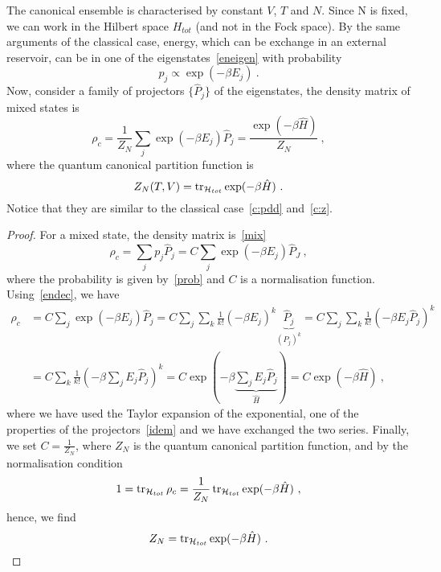     The canonical ensemble is characterised by constant $V$, $T$ and $N$. Since N
    is fixed, we can work in the Hilbert space $H_{tot}$ (and not in the Fock space).
    By the same arguments of the classical case, energy, which can be exchange in an external reservoir, can be in one of the eigenstates~\eqref{eneigen} with probability 
    \begin{equation}\label{prob}
        p_j \propto \exp(- \beta E_j) ~.
    \end{equation}
    Now, consider a family of projectors $\{\hat P_j\}$ of the eigenstates, the density matrix of mixed states is 
    \begin{equation*}
        \rho_c = \frac{1}{Z_N } \sum_j \exp(- \beta E_j) \hat P_j = \frac{\exp(- \beta \hat H)}{Z_N} ~,
    \end{equation*}
    where the quantum canonical partition function is 
    \begin{equation}\label{qgc:cz}
        Z_N(T,V) = \operatorname{tr}_{\mathcal H_{tot}} \exp(- \beta \hat H) ~.
    \end{equation}
    Notice that they are similar to the classical case~\eqref{c:pdd} and~\eqref{c:z}.
    \begin{proof}
        For a mixed state, the density matrix is~\eqref{mix}
        \begin{equation*}
            \rho_c = \sum_j p_j \hat P_j = C \sum_j \exp(- \beta E_j) \hat P_J ~,
        \end{equation*}
        where the probability is given by~\eqref{prob} and $C$ is a normalisation function.
        Using~\eqref{endec}, we have
        \begin{equation*}
        \begin{aligned}
            \rho_c & = C \sum_j \exp(- \beta E_j) \hat P_j = C \sum_j \sum_k \frac{1}{k!} (-\beta E_j)^k \underbrace{\hat P_j}_{(P_j)^k} = C \sum_j \sum_k \frac{1}{k!} (-\beta E_j \hat P_j)^k \\ & = C \sum_k \frac{1}{k!} (-\beta \sum_j E_j \hat P_j)^k = C \exp(- \beta \underbrace{\sum_j E_j \hat P_j}_{\hat H}) = C \exp(- \beta \hat H) ~,
        \end{aligned}
        \end{equation*}
        where we have used the Taylor expansion of the exponential, one of the properties of the projectors~\eqref{idem} and we have exchanged the two series.
        Finally, we set $C = \frac{1}{Z_N}$, where $Z_N$ is the quantum canonical partition function, and by the normalisation condition
        \begin{equation*}
            1 = \operatorname{tr}_{\mathcal H_{tot}} \rho_c = \frac{1}{Z_N} \operatorname{tr}_{\mathcal H_{tot}} \exp(- \beta \hat H) ~,
        \end{equation*}
        hence, we find 
        \begin{equation*}
            Z_N = \operatorname{tr}_{\mathcal H_{tot}} \exp(- \beta \hat H) ~.
        \end{equation*}
    \end{proof}

